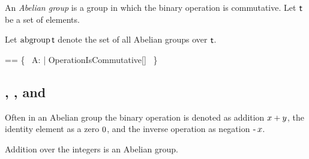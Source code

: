 \documentclass[11pt, oneside]{article}
\begin{document}
An {\em Abelian group} is a group in which the binary operation is commutative.
Let $\mathsf{t}$ be a set of elements.

Let $\operatorname{abgroup} \mathsf{t}$ denote the set of all Abelian groups over $\mathsf{t}$.

\begin{zed}
\abgroup \genT == \{~ A: \group \genT | OperationIsCommutative[\genT] ~\}
\end{zed}

\subsection{, , and }

Often in an Abelian group the binary operation is denoted as addition $x \mathbin{+} y$,
the identity element as a zero $0$, and the inverse operation as negation $\operatorname{-} x$.

\begin{example}
Addition over the integers is an Abelian group.

\begin{zed}
	(\_ + \_) \in \abgroup \num
\end{zed}

\end{example}

\printbibliography
\end{document}
